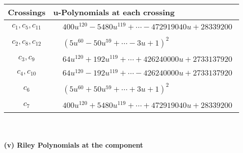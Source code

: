 \documentclass[1p]{elsarticle_modified}
\theoremstyle{definition}
\begin{document}
\begin{tabular}{m{50pt}|m{274pt}}
Crossings & \hspace{64pt}u-Polynomials at each crossing \\
\hline $$\begin{aligned}c_{1},c_{5},c_{11}\end{aligned}$$&$\begin{aligned}
&400 u^{120}-5480 u^{119}+\cdots-472919040 u+28339200
\end{aligned}$\\
\hline $$\begin{aligned}c_{2},c_{8},c_{12}\end{aligned}$$&$\begin{aligned}
&(5 u^{60}-50 u^{59}+\cdots-3 u+1)^{2}
\end{aligned}$\\
\hline $$\begin{aligned}c_{3},c_{9}\end{aligned}$$&$\begin{aligned}
&64 u^{120}+192 u^{119}+\cdots+426240000 u+2733137920
\end{aligned}$\\
\hline $$\begin{aligned}c_{4},c_{10}\end{aligned}$$&$\begin{aligned}
&64 u^{120}-192 u^{119}+\cdots-426240000 u+2733137920
\end{aligned}$\\
\hline $$\begin{aligned}c_{6}\end{aligned}$$&$\begin{aligned}
&(5 u^{60}+50 u^{59}+\cdots+3 u+1)^{2}
\end{aligned}$\\
\hline $$\begin{aligned}c_{7}\end{aligned}$$&$\begin{aligned}
&400 u^{120}+5480 u^{119}+\cdots+472919040 u+28339200
\end{aligned}$\\
\hline
\end{tabular}\\~\\
\newpage\renewcommand{\arraystretch}{1}
\flushleft \textbf{(v) Riley Polynomials at the component}\newline \\
\end{document}

